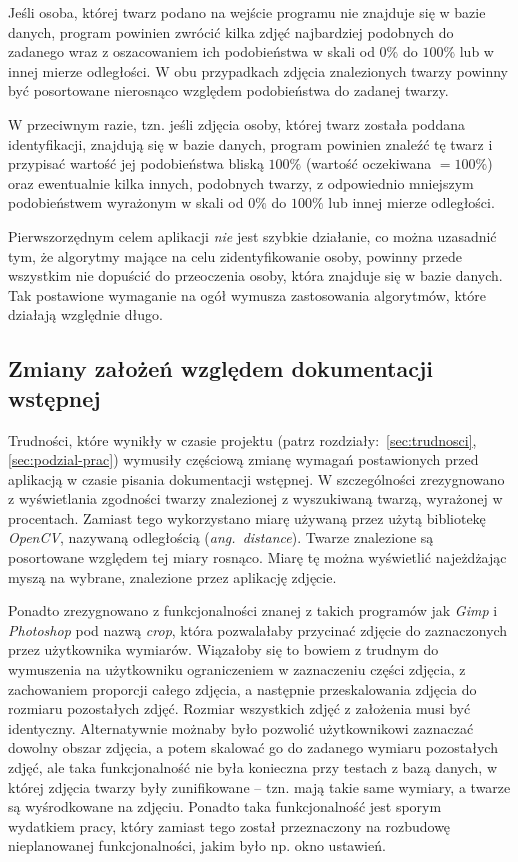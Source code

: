 \documentclass[a4paper,titlepage]{article}
\theoremstyle{break}
\numberwithin{equation}{subsection}
\begin{document}
Jeśli osoba, której twarz podano na wejście programu nie znajduje się w bazie danych, program powinien zwrócić kilka zdjęć najbardziej podobnych do zadanego wraz z oszacowaniem ich podobieństwa w skali od $0\%$ do $100\%$ lub w innej mierze odległości. W obu przypadkach zdjęcia znalezionych twarzy powinny być posortowane nierosnąco względem podobieństwa do zadanej twarzy.

W przeciwnym razie, tzn. jeśli zdjęcia osoby, której twarz została poddana identyfikacji, znajdują się w bazie danych, program powinien znaleźć tę twarz i przypisać wartość jej podobieństwa bliską $100\%$ (wartość oczekiwana $=100\%$) oraz ewentualnie kilka innych, podobnych twarzy, z odpowiednio mniejszym podobieństwem wyrażonym w skali od $0\%$ do $100\%$ lub innej mierze odległości.

Pierwszorzędnym celem aplikacji \emph{nie} jest szybkie działanie, co można uzasadnić tym, że algorytmy mające na celu zidentyfikowanie osoby, powinny przede wszystkim nie dopuścić do przeoczenia osoby, która znajduje się w bazie danych. Tak postawione wymaganie na ogół wymusza zastosowania algorytmów, które działają względnie długo.


\subsection{Zmiany założeń względem dokumentacji wstępnej}

Trudności, które wynikły w czasie projektu (patrz rozdziały:~\ref{sec:trudnosci}, \ref{sec:podzial-prac}) wymusiły częściową zmianę wymagań postawionych przed aplikacją w czasie pisania dokumentacji wstępnej. W szczególności zrezygnowano z wyświetlania zgodności twarzy znalezionej z wyszukiwaną twarzą, wyrażonej w procentach. Zamiast tego wykorzystano miarę używaną przez użytą bibliotekę \emph{OpenCV}, nazywaną odległością (\emph{ang.~distance}). Twarze znalezione są posortowane względem tej miary rosnąco. Miarę tę można wyświetlić najeżdżając myszą na wybrane, znalezione przez aplikację zdjęcie.

Ponadto zrezygnowano z funkcjonalności znanej z takich programów jak \emph{Gimp} i \emph{Photoshop} pod nazwą \emph{crop}, która pozwalałaby przycinać zdjęcie do zaznaczonych przez użytkownika wymiarów. Wiązałoby się to bowiem z trudnym do wymuszenia na użytkowniku ograniczeniem w zaznaczeniu części zdjęcia, z zachowaniem proporcji całego zdjęcia, a następnie przeskalowania zdjęcia do rozmiaru pozostałych zdjęć. Rozmiar wszystkich zdjęć z założenia musi być identyczny. Alternatywnie możnaby było pozwolić użytkownikowi zaznaczać dowolny obszar zdjęcia, a potem skalować go do zadanego wymiaru pozostałych zdjęć, ale taka funkcjonalność nie była konieczna przy testach z bazą danych, w której zdjęcia twarzy były zunifikowane -- tzn. mają takie same wymiary, a twarze są wyśrodkowane na zdjęciu. Ponadto taka funkcjonalność jest sporym wydatkiem pracy, który zamiast tego został przeznaczony na rozbudowę nieplanowanej funkcjonalności, jakim było np. okno ustawień.
\end{document}
